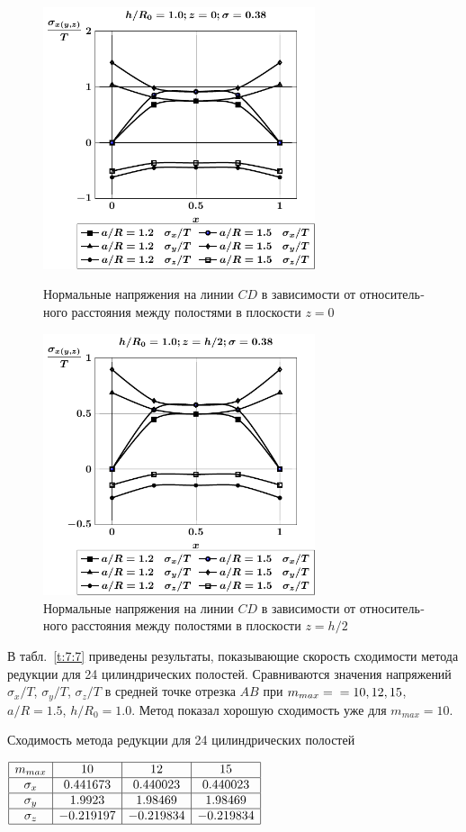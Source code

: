 \begin{russian}
\begin{figure}[h!]
\centering\footnotesize
\parbox[b]{7.5cm}{\centering\includegraphics[width=8cm]{cav24-a-h10-r10-z0-diag.pdf}
\caption{Нормальные напряжения на линии $CD$ в зависимости от относительного расстояния между полостями в плоскости $z=0$
\label{f:7:128}}}\hfil\hfil
\parbox[b]{7.5cm}{\centering\includegraphics[width=8cm]{cav24-a-h10-r10-z1-diag.pdf}
\caption{Нормальные напряжения на линии $CD$ в зависимости от относительного расстояния между полостями в плоскости $z=h/2$
\label{f:7:129}}}
\end{figure}

В табл.~\ref{t:7:7} приведены результаты, показывающие скорость сходимости метода редукции для 24 цилиндрических полостей. Сравниваются значения напряжений $\sigma_x/T$, $\sigma_y/T$, $\sigma_z/T$ в средней точке отрезка $AB$ при $m_{max}=\\=10,12,15$, $a/R=1.5$, $h/R_0=1.0$. Метод показал хорошую сходимость уже для $m_{max}=10$.\par\sloppy

\begin{table}[h!]
\caption{Сходимость метода редукции для 24 цилиндрических полостей}
\centering
$
\begin{array}{|c|c|c|c|}
\hline
m_{max} & 10 & 12 & 15 \\
\hline
\sigma_x & 0.441673 & 0.440023 & 0.440023 \\
\hline
\sigma_y & 1.9923 & 1.98469 & 1.98469 \\
\hline
\sigma_z & -0.219197 & -0.219834 & -0.219834 \\
\hline
\end{array}
$
\label{t:7:7}
\end{table}


\end{russian}
